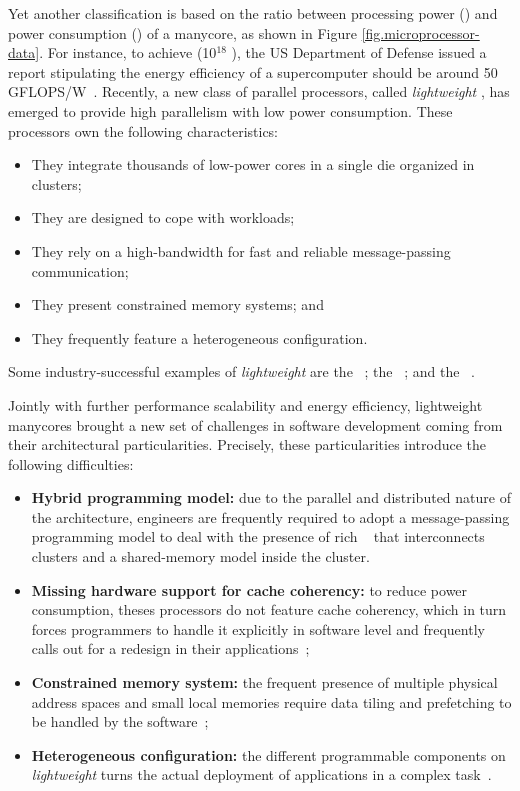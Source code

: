 	Yet another classification is based on the ratio between processing power (\flops)
	and power consumption (\watts) of a manycore, as shown in Figure \ref{fig.microprocessor-data}.
	For instance, to achieve \exascale (10$^{18}$ \flops), the US Department of Defense
	issued a report stipulating the energy efficiency of a supercomputer should be
	around 50 GFLOPS/W~\cite{darpa:exascale}.
	Recently, a new class of parallel processors, called \textit{lightweight} \manycores,
	has emerged to provide high parallelism with low power consumption.
	These processors own the following characteristics:

	\begin{itemize}
		\item They integrate thousands of low-power cores in a single die organized in clusters;
		\item They are designed to cope with \mimd workloads;
		\item They rely on a high-bandwidth \noc for fast and reliable message-passing communication;
		\item They present constrained memory systems; and
		\item They frequently feature a heterogeneous configuration.
	\end{itemize}

	Some industry-successful examples of \textit{lightweight} \manycores are
	the \mppa~\cite{DeDinechin2013-1};
	the \epiphany~\cite{olofsson2014}; and
	the \taihulight~\cite{zheng2015}.

	Jointly with further performance scalability and energy efficiency, lightweight manycores brought
	a new set of challenges in software development coming from their architectural particularities.
	Precisely, these particularities introduce the following difficulties:
	\begin{itemize}
		\item \textbf{Hybrid programming model:} due to the parallel and distributed nature of
			the architecture, engineers are frequently required to adopt a message-passing
			programming model to deal with the presence of rich \nocs~\cite{kelly2013} that
			interconnects clusters and a shared-memory model inside the cluster.
		\item \textbf{Missing hardware support for cache coherency:} to reduce power consumption,
			theses processors do not feature cache coherency, which in turn forces programmers to
			handle it explicitly in software level and frequently calls out for a redesign in their
			applications~\cite{francesquini2015};
		\item \textbf{Constrained memory system:} the frequent presence of multiple physical
			address spaces and small local memories require data tiling and prefetching to be
			handled by the software~\cite{Castro2016};
		\item \textbf{Heterogeneous configuration:} the different programmable components on
			\textit{lightweight} \manycores turns the actual deployment of applications in a
			complex task~\cite{barbalace2015}.
	\end{itemize}

